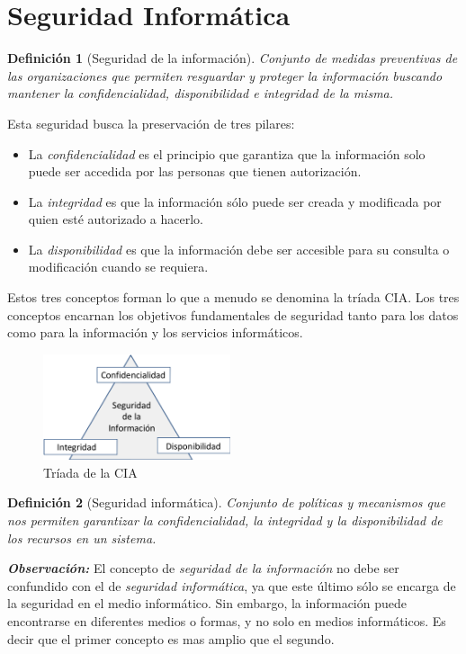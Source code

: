 \documentclass[peerreview]{IEEEtran}
\newtheorem{defin}{Definición}
\begin{document}
\section{Seguridad Informática}
\begin{defin}[Seguridad de la información]
Conjunto de medidas preventivas de las organizaciones  que permiten resguardar y proteger la información buscando mantener la confidencialidad, disponibilidad e integridad de la misma.
\end{defin}
\bigbreak
Esta seguridad busca la preservación de tres pilares:
\begin{itemize}
    \item La \textit{confidencialidad} es el principio que garantiza que la información solo puede ser accedida por las personas que tienen autorización.
    \item La \textit{integridad} es que la información sólo puede ser creada y modificada por quien esté autorizado a hacerlo.
    \item La \textit{disponibilidad} es que la información debe ser accesible para su consulta o modificación cuando se requiera.
\end{itemize}
\bigbreak
Estos tres conceptos forman lo que a menudo se denomina la tríada CIA. Los tres conceptos encarnan los objetivos fundamentales de seguridad tanto para los datos como para la información y los servicios informáticos.
\begin{figure}[htbp]
\centering
\includegraphics[width=5.5cm]{figuras/cia_tirada.png} 
\caption{Tríada de la CIA}
\label{fig: 1}
\end{figure}
\bigbreak
\begin{defin}[Seguridad informática]
Conjunto de políticas y mecanismos que nos permiten garantizar la confidencialidad, la integridad y la disponibilidad de los recursos en un sistema.
\end{defin}
\bigbreak
\textbf{\textit{Observación:}} El concepto de \textit{seguridad de la información} no debe ser confundido con el de \textit{seguridad informática}, ya que este último sólo se encarga de la seguridad en el medio informático. Sin embargo, la información puede encontrarse en diferentes medios o formas, y no solo en medios informáticos. Es decir que el primer concepto es mas amplio que el segundo.
\end{document}

